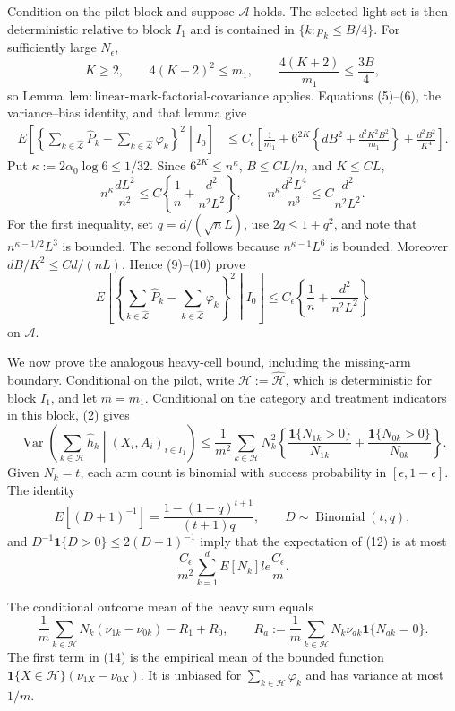 Condition on the pilot block and suppose \(\mathcal A\) holds.  The selected light set is then deterministic relative to block \(I_1\) and is contained in \(\{k:p_k\le B/4\}\).  For sufficiently large \(N_\epsilon\),
\[
 K\ge2,\qquad 4(K+2)^2\le m_1,
 \qquad \frac{4(K+2)}{m_1}\le\frac{3B}{4},
\tag{8}
\]
so Lemma~\(\mathrm{lem:linear\text{-}mark\text{-}factorial\text{-}covariance}\) applies.  Equations (5)--(6), the variance--bias identity, and that lemma give
\[
 \begin{split}
 E\left[\left\{
 \sum_{k\in\widehat{\mathcal L}}\widehat P_k
 -\sum_{k\in\widehat{\mathcal L}}\varphi_k
 \right\}^2\middle|I_0\right]
 &\le C_\epsilon\left[\frac1{m_1}
 +6^{2K}\left\{dB^2+\frac{d^2K^2B^2}{m_1}\right\}
 +\frac{d^2B^2}{K^4}\right].
\end{split}
\tag{9}
\]
Put \(\kappa:=2\alpha_0\log6\le1/32\).  Since \(6^{2K}\le n^\kappa\), \(B\le CL/n\), and \(K\le CL\),
\[
 n^\kappa\frac{dL^2}{n^2}
 \le C\left\{\frac1n+\frac{d^2}{n^2L^2}\right\},
 \qquad
 n^\kappa\frac{d^2L^4}{n^3}
 \le C\frac{d^2}{n^2L^2}.
\tag{10}
\]
For the first inequality, set \(q=d/(\sqrt nL)\), use \(2q\le1+q^2\), and note that \(n^{\kappa-1/2}L^3\) is bounded.  The second follows because \(n^{\kappa-1}L^6\) is bounded.  Moreover \(dB/K^2\le Cd/(nL)\).  Hence (9)--(10) prove
\[
 E\left[\left\{
 \sum_{k\in\widehat{\mathcal L}}\widehat P_k
 -\sum_{k\in\widehat{\mathcal L}}\varphi_k
 \right\}^2\middle|I_0\right]
 \le C_\epsilon\left\{\frac1n+\frac{d^2}{n^2L^2}\right\}
\tag{11}
\]
on \(\mathcal A\).

We now prove the analogous heavy-cell bound, including the missing-arm boundary.  Conditional on the pilot, write \(\mathcal H:=\widehat{\mathcal H}\), which is deterministic for block \(I_1\), and let \(m=m_1\).  Conditional on the category and treatment indicators in this block, (2) gives
\[
 \operatorname{Var}\left(\sum_{k\in\mathcal H}\widehat h_k
 \middle|(X_i,A_i)_{i\in I_1}\right)
 \le \frac1{m^2}\sum_{k\in\mathcal H}N_k^2
 \left\{\frac{\mathbf1\{N_{1k}>0\}}{N_{1k}}
 +\frac{\mathbf1\{N_{0k}>0\}}{N_{0k}}\right\}.
\tag{12}
\]
Given \(N_k=t\), each arm count is binomial with success probability in \([\epsilon,1-\epsilon]\).  The identity
\[
 E[(D+1)^{-1}]=\frac{1-(1-q)^{t+1}}{(t+1)q},
 \qquad D\sim\operatorname{Binomial}(t,q),
\]
and \(D^{-1}\mathbf1\{D>0\}\le2(D+1)^{-1}\) imply that the expectation of (12) is at most
\[
 \frac{C_\epsilon}{m^2}\sum_{k=1}^dE[N_k]le\frac{C_\epsilon}{m}.
\tag{13}
\]

The conditional outcome mean of the heavy sum equals
\[
 \frac1m\sum_{k\in\mathcal H}N_k(\nu_{1k}-\nu_{0k})
 -R_1+R_0,
 \qquad
 R_a:=\frac1m\sum_{k\in\mathcal H}N_k\nu_{ak}\mathbf1\{N_{ak}=0\}.
\tag{14}
\]
The first term in (14) is the empirical mean of the bounded function
\(\mathbf1\{X\in\mathcal H\}(\nu_{1X}-\nu_{0X})\).  It is unbiased for \(\sum_{k\in\mathcal H}\varphi_k\) and has variance at most \(1/m\).

